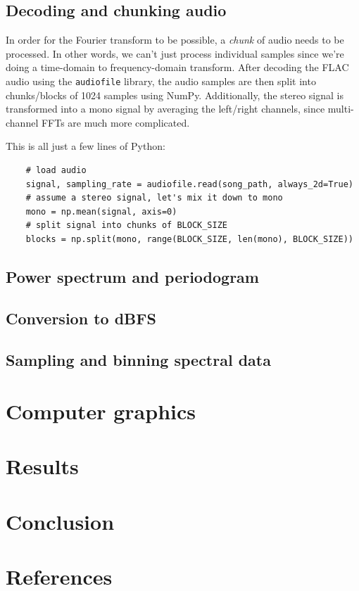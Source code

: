 \documentclass[11pt]{article}
\begin{document}
\subsection{Decoding and chunking audio}
In order for the Fourier transform to be possible, a \textit{chunk} of audio needs to be processed. In other
words, we can't just process individual samples since we're doing a time-domain to frequency-domain
transform. After decoding the FLAC audio using the \verb|audiofile| library, the audio samples are then split
into chunks/blocks of 1024 samples using NumPy. Additionally, the stereo signal is transformed into a mono
signal by averaging the left/right channels, since multi-channel FFTs are much more complicated.

This is all just a few lines of Python:
\begin{verbatim}
    # load audio
    signal, sampling_rate = audiofile.read(song_path, always_2d=True)
    # assume a stereo signal, let's mix it down to mono
    mono = np.mean(signal, axis=0)
    # split signal into chunks of BLOCK_SIZE
    blocks = np.split(mono, range(BLOCK_SIZE, len(mono), BLOCK_SIZE))
\end{verbatim}


\subsection{Power spectrum and periodogram}

\subsection{Conversion to dBFS}

\subsection{Sampling and binning spectral data}

\section{Computer graphics}

\section{Results}

\section{Conclusion}

\section{References}
\printbibliography[heading=none]
\end{document}
